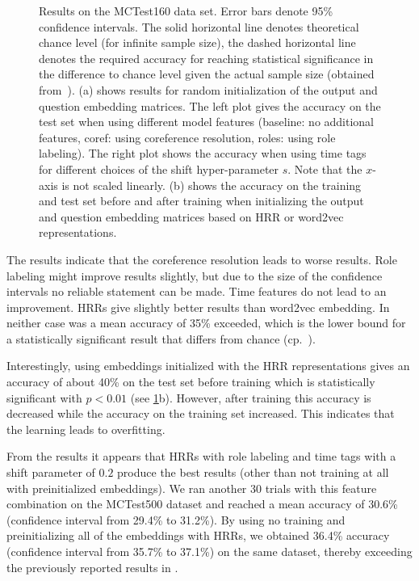 \documentclass[10pt]{article}
\begin{document}
\begin{figure}
    \caption{Results on the MCTest160 data set. Error bars denote 95\% 
        confidence intervals. The solid horizontal line denotes theoretical 
        chance level (for infinite sample size), the dashed horizontal line 
        denotes the required accuracy for reaching statistical significance 
        in the difference to chance level given the actual sample size (obtained 
        from~\cite{combrisson2015exceeding}).  (a) shows results for random 
        initialization of the output and question embedding matrices.  The left plot gives the 
        accuracy on the test set when using different model features (baseline: 
        no additional features, coref: using coreference resolution, roles: 
        using role labeling). The right plot shows the accuracy when using time 
        tags for different choices of the shift hyper-parameter $s$.  Note that 
        the $x$-axis is not scaled linearly. (b) shows the accuracy on the 
        training and test set before and after training when initializing the 
        output and question embedding matrices based on HRR or word2vec 
        representations.}\label{fig:results}
\end{figure}

The results indicate that the coreference resolution leads to worse results.  
Role labeling might improve results slightly, but due to the size of the 
confidence intervals no reliable statement can be made. Time features do not 
lead to an improvement. HRRs give slightly better results than word2vec 
embedding. In neither case was a mean accuracy of 35\% exceeded, which is the 
lower bound for a statistically significant result that differs from chance 
(cp.~\cite{combrisson2015exceeding}).

Interestingly, using embeddings initialized with the HRR representations 
gives an accuracy of about 40\% on the test set before training which is 
statistically significant with $p < 0.01$ (see \ref{fig:results}b). However, 
after training this accuracy is decreased while the accuracy on the training set 
increased. This indicates that the learning leads to overfitting.

From the results it appears that HRRs with role labeling and time tags with 
a shift parameter of $0.2$ produce the best results (other than not training 
at all with preinitialized embeddings). We ran another 30 trials with 
this feature combination on the MCTest500 dataset and reached a mean accuracy of 
30.6\% (confidence interval from 29.4\% to 31.2\%). By using no training and 
preinitializing all of the embeddings with HRRs, we obtained 36.4\% accuracy (confidence 
interval from 35.7\% to 37.1\%) on the same dataset, thereby exceeding the previously 
reported results in \cite{Darshan:2015}.
\end{document}
